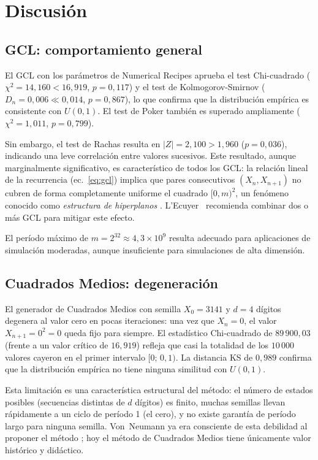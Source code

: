 \documentclass[a4paper, 11pt]{article}
\begin{document}
\section{Discusión}

\subsection{GCL: comportamiento general}

El GCL con los parámetros de Numerical Recipes aprueba el test Chi-cuadrado
($\chi^2 = 14{,}160 < 16{,}919$, $p = 0{,}117$) y el test de Kolmogorov-Smirnov
($D_n = 0{,}006 \ll 0{,}014$, $p = 0{,}867$), lo que confirma que la
distribución empírica es consistente con $U(0,1)$. El test de Poker también
es superado ampliamente ($\chi^2 = 1{,}011$, $p = 0{,}799$).

Sin embargo, el test de Rachas resulta en $|Z| = 2{,}100 > 1{,}960$ ($p = 0{,}036$),
indicando una leve correlación entre valores sucesivos. Este resultado, aunque
marginalmente significativo, es característico de todos los GCL: la relación
lineal de la recurrencia (ec.~\ref{eq:gcl}) implica que pares consecutivos
$(X_n, X_{n+1})$ no cubren de forma completamente uniforme el cuadrado
$[0,m)^2$, un fenómeno conocido como \emph{estructura de hiperplanos}
\cite{knuth1997art}. L'Ecuyer~\cite{lecuyer1988efficient} recomienda combinar
dos o más GCL para mitigar este efecto.

El período máximo de $m = 2^{32} \approx 4{,}3 \times 10^9$ resulta adecuado
para aplicaciones de simulación moderadas, aunque insuficiente para simulaciones
de alta dimensión.

\subsection{Cuadrados Medios: degeneración}

El generador de Cuadrados Medios con semilla $X_0 = 3141$ y $d = 4$ dígitos
degenera al valor cero en pocas iteraciones: una vez que $X_n = 0$, el valor
$X_{n+1} = 0^2 = 0$ queda fijo para siempre. El estadístico Chi-cuadrado de
$89\,900{,}03$ (frente a un valor crítico de $16{,}919$) refleja que casi la
totalidad de los $10\,000$ valores cayeron en el primer intervalo $[0;\,0{,}1)$.
La distancia KS de $0{,}989$ confirma que la distribución empírica no tiene
ninguna similitud con $U(0,1)$.

Esta limitación es una característica estructural del método: el número de
estados posibles (secuencias distintas de $d$ dígitos) es finito, muchas
semillas llevan rápidamente a un ciclo de período 1 (el cero), y no existe
garantía de período largo para ninguna semilla. Von~Neumann ya era consciente
de esta debilidad al proponer el método \cite{vonneumann1951various}; hoy el
método de Cuadrados Medios tiene únicamente valor histórico y didáctico.
\end{document}
